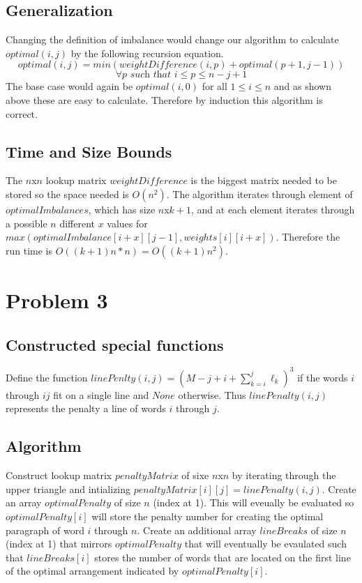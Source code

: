\documentclass[11pt]{article}
\begin{document}
\subsection*{Generalization}
Changing the definition of imbalance would change our algorithm to calculate $optimal(i,j)$ by the following recursion equation.
\[optimal(i,j) = min(weightDifference(i,p) + optimal(p+1,j-1))\]
\[ \forall	p \textit{ such that } i \leq p \leq n-j+1\]
The base case would again be $optimal(i,0)$ for all $1 \leq i \leq n$ and as shown above these are easy to calculate. Therefore by induction this algorithm is correct.

\subsection*{Time and Size Bounds}
The $n$x$n$ lookup matrix $weightDifference$ is the biggest matrix needed to be stored so the space needed is $O(n^2)$. The algorithm iterates through element of $optimalImbalances$, which has size $n$x$k+1$, and at each element iterates through a possible $n$ different $x$ values for $max(optimalImbalance[i+x][j-1], weights[i][i+x])$. Therefore the run time is $O((k+1)n*n)=O((k+1)n^2)$.

\section*{Problem 3}
\subsection*{Constructed special functions}
Define the function $linePenlty(i, j) = (M - j+i + \sum_{k=i}^{j} \ell_k)^3$ if the words $i$ through $ij$ fit on a single line and $None$ otherwise. Thus $linePenalty(i,j)$ represents the penalty a line of words $i$ through $j$. 

\subsection*{Algorithm}
Construct lookup matrix $penaltyMatrix$ of sixe $n$x$n$ by iterating through the upper triangle and intializing $penaltyMatrix[i][j] = linePenalty(i,j)$. Create an array $optimalPenalty$ of size $n$ (index at 1). This will eveually be evaluated so $optimalPenalty[i]$ will store the penalty number for creating the optimal paragraph of word $i$ through $n$. Create an additional array $lineBreaks$ of size $n$ (index at 1) that mirrors $optimalPenalty$ that will eventually be evaulated such that $lineBreaks[i]$ stores the number of words that are located on the first line of the optimal arrangement indicated by $optimalPenalty[i]$. \\
\end{document}
